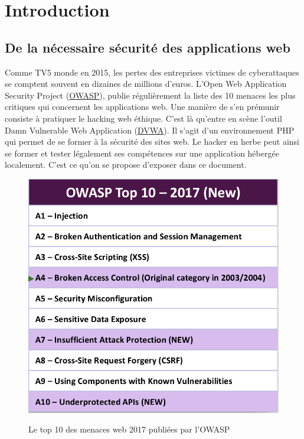 
\pagebreak

\section*{Introduction}

\subsection*{De la nécessaire sécurité des applications web}

Comme TV5 monde en 2015, les pertes des entreprises victimes de cyberattaques se comptent souvent en dizaines de millions d'euros. L'Open Web Application Security Project (\href{https://www.owasp.org}{OWASP}), publie régulièrement la liste des 10 menaces les plus critiques qui concernent les applications web. Une manière de s'en prémunir consiste à pratiquer le hacking web éthique. C'est là qu'entre en scène l'outil Damn Vulnerable Web Application (\href{http://www.dvwa.co.uk}{DVWA}). Il s'agit d'un environnement PHP qui permet de se former à la sécurité des sites web. Le hacker en herbe peut ainsi se former et tester légalement ses compétences sur une application hébergée localement. C'est ce qu'on se propose d'exposer dans ce document.  

\begin{figure}[!h]
	\begin{center}
		\label{10_menaces}
		\includegraphics[scale=0.4]{images/10_menaces.png}
		\caption{Le top 10 des menaces web 2017 publiées par l'OWASP}
	\end{center}
\end{figure}

